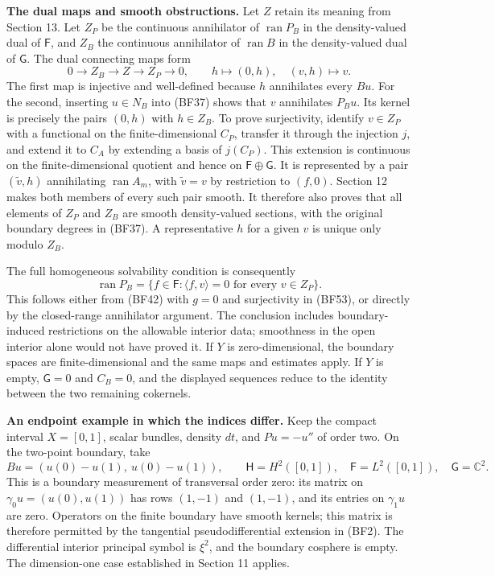 \documentclass[
  11pt,
]{article}
\begin{document}
\textbf{The dual maps and smooth obstructions.} Let \(Z\) retain its
meaning from Section 13. Let \(Z_P\) be the continuous annihilator of
\(\operatorname{ran}P_B\) in the density-valued dual of \(\mathsf F\),
and \(Z_B\) the continuous annihilator of \(\operatorname{ran}B\) in the
density-valued dual of \(\mathsf G\). The dual connecting maps form \[
 0\longrightarrow Z_B\longrightarrow Z
 \longrightarrow Z_P\longrightarrow0,
 \qquad h\longmapsto(0,h),\quad (v,h)\longmapsto v.
 \tag{BF53}
\] The first map is injective and well-defined because \(h\) annihilates
every \(Bu\). For the second, inserting \(u\in N_B\) into (BF37) shows
that \(v\) annihilates \(P_Bu\). Its kernel is precisely the pairs
\((0,h)\) with \(h\in Z_B\). To prove surjectivity, identify
\(v\in Z_P\) with a functional on the finite-dimensional \(C_P\),
transfer it through the injection \(j\), and extend it to \(C_A\) by
extending a basis of \(j(C_P)\). This extension is continuous on the
finite-dimensional quotient and hence on \(\mathsf F\oplus\mathsf G\).
It is represented by a pair \((\widetilde v,h)\) annihilating
\(\operatorname{ran}A_m\), with \(\widetilde v=v\) by restriction to
\((f,0)\). Section 12 makes both members of every such pair smooth. It
therefore also proves that all elements of \(Z_P\) and \(Z_B\) are
smooth density-valued sections, with the original boundary degrees in
(BF37). A representative \(h\) for a given \(v\) is unique only modulo
\(Z_B\).

The full homogeneous solvability condition is consequently \[
 \operatorname{ran}P_B
 =\{f\in\mathsf F:\langle f,v\rangle=0
                 \text{ for every }v\in Z_P\}.
 \tag{BF54}
\] This follows either from (BF42) with \(g=0\) and surjectivity in
(BF53), or directly by the closed-range annihilator argument. The
conclusion includes boundary-induced restrictions on the allowable
interior data; smoothness in the open interior alone would not have
proved it. If \(Y\) is zero-dimensional, the boundary spaces are
finite-dimensional and the same maps and estimates apply. If \(Y\) is
empty, \(\mathsf G=0\) and \(C_B=0\), and the displayed sequences reduce
to the identity between the two remaining cokernels.

\textbf{An endpoint example in which the indices differ.} Keep the
compact interval \(X=[0,1]\), scalar bundles, density \(dt\), and
\(Pu=-u''\) of order two. On the two-point boundary, take \[
 Bu=(u(0)-u(1),\ u(0)-u(1)),\qquad
 \mathsf H=H^2([0,1]),\quad\mathsf F=L^2([0,1]),
 \quad\mathsf G=\mathbb C^2.
 \tag{BF55}
\] This is a boundary measurement of transversal order zero: its matrix
on \(\gamma_0u=(u(0),u(1))\) has rows \((1,-1)\) and \((1,-1)\), and its
entries on \(\gamma_1u\) are zero. Operators on the finite boundary have
smooth kernels; this matrix is therefore permitted by the tangential
pseudodifferential extension in (BF2). The differential interior
principal symbol is \(\xi^2\), and the boundary cosphere is empty. The
dimension-one case established in Section 11 applies.
\end{document}
